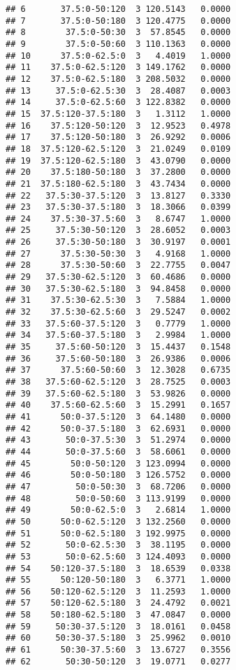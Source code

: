 \begin{knitrout}
\begin{kframe}
\begin{verbatim}
## 6       37.5:0-50:120  3 120.5143   0.0000
## 7       37.5:0-50:180  3 120.4775   0.0000
## 8        37.5:0-50:30  3  57.8545   0.0000
## 9        37.5:0-50:60  3 110.1363   0.0000
## 10      37.5:0-62.5:0  3   4.4019   1.0000
## 11    37.5:0-62.5:120  3 149.1762   0.0000
## 12    37.5:0-62.5:180  3 208.5032   0.0000
## 13     37.5:0-62.5:30  3  28.4087   0.0003
## 14     37.5:0-62.5:60  3 122.8382   0.0000
## 15  37.5:120-37.5:180  3   1.3112   1.0000
## 16    37.5:120-50:120  3  12.9523   0.4978
## 17    37.5:120-50:180  3  26.9292   0.0006
## 18  37.5:120-62.5:120  3  21.0249   0.0109
## 19  37.5:120-62.5:180  3  43.0790   0.0000
## 20    37.5:180-50:180  3  37.2800   0.0000
## 21  37.5:180-62.5:180  3  43.7434   0.0000
## 22   37.5:30-37.5:120  3  13.8127   0.3330
## 23   37.5:30-37.5:180  3  18.3066   0.0399
## 24    37.5:30-37.5:60  3   8.6747   1.0000
## 25     37.5:30-50:120  3  28.6052   0.0003
## 26     37.5:30-50:180  3  30.9197   0.0001
## 27      37.5:30-50:30  3   4.9168   1.0000
## 28      37.5:30-50:60  3  22.7755   0.0047
## 29   37.5:30-62.5:120  3  60.4686   0.0000
## 30   37.5:30-62.5:180  3  94.8458   0.0000
## 31    37.5:30-62.5:30  3   7.5884   1.0000
## 32    37.5:30-62.5:60  3  29.5247   0.0002
## 33   37.5:60-37.5:120  3   0.7779   1.0000
## 34   37.5:60-37.5:180  3   2.9984   1.0000
## 35     37.5:60-50:120  3  15.4437   0.1548
## 36     37.5:60-50:180  3  26.9386   0.0006
## 37      37.5:60-50:60  3  12.3028   0.6735
## 38   37.5:60-62.5:120  3  28.7525   0.0003
## 39   37.5:60-62.5:180  3  53.9826   0.0000
## 40    37.5:60-62.5:60  3  15.2991   0.1657
## 41      50:0-37.5:120  3  64.1480   0.0000
## 42      50:0-37.5:180  3  62.6931   0.0000
## 43       50:0-37.5:30  3  51.2974   0.0000
## 44       50:0-37.5:60  3  58.6061   0.0000
## 45        50:0-50:120  3 123.0994   0.0000
## 46        50:0-50:180  3 126.5752   0.0000
## 47         50:0-50:30  3  68.7206   0.0000
## 48         50:0-50:60  3 113.9199   0.0000
## 49        50:0-62.5:0  3   2.6814   1.0000
## 50      50:0-62.5:120  3 132.2560   0.0000
## 51      50:0-62.5:180  3 192.9975   0.0000
## 52       50:0-62.5:30  3  38.1195   0.0000
## 53       50:0-62.5:60  3 124.4093   0.0000
## 54    50:120-37.5:180  3  18.6539   0.0338
## 55      50:120-50:180  3   6.3771   1.0000
## 56    50:120-62.5:120  3  11.2593   1.0000
## 57    50:120-62.5:180  3  24.4792   0.0021
## 58    50:180-62.5:180  3  47.0847   0.0000
## 59     50:30-37.5:120  3  18.0161   0.0458
## 60     50:30-37.5:180  3  25.9962   0.0010
## 61      50:30-37.5:60  3  13.6727   0.3556
## 62       50:30-50:120  3  19.0771   0.0277

\end{verbatim}
\end{kframe}
\end{knitrout}
